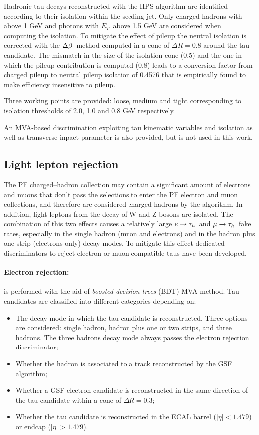 Hadronic tau decays reconstructed with the HPS algorithm are identified according to their isolation within the seeding jet. Only charged hadrons with \pT above 1 GeV and photons with $E_T$\ above 1.5 GeV are considered when computing the isolation. To mitigate the effect of pileup the neutral isolation is corrected with the $\Delta\beta$\ method computed in a cone of $\Delta R = 0.8$ around the tau candidate. The mismatch in the size of the isolation cone ($0.5$) and the one in which the pileup contribution is computed (0.8) leads to a conversion factor from charged pileup to neutral pileup isolation of 0.4576 that is empirically found to make efficiency insensitive to pileup.

Three working points are provided: loose, medium and tight corresponding to isolation thresholds of 2.0, 1.0 and 0.8 GeV respectively.

An MVA-based discrimination exploiting tau kinematic variables and isolation as well as transverse inpact parameter is also provided, but is not used in this work.

\subsection{Light lepton rejection}

The PF charged--hadron collection may contain a significant amount of electrons and muons that don't pass the selections to enter the PF electron and muon collections, and therefore are considered charged hadrons by the algorithm. In addition, light leptons from the decay of W and Z bosons are isolated. The combination of this two effects causes a relatively large $e\rightarrow\tau_h$\ and $\mu\rightarrow\tau_h$\ fake rates, especially in the single hadron (muon and electrons) and in the hadron plus one strip (electrons only) decay modes. To mitigate this effect dedicated discriminators to reject electron or muon compatible taus have been developed.

\paragraph{Electron rejection:} is performed with the aid of \emph{boosted decision trees} (BDT) MVA method. Tau candidates are classified into different categories depending on:

\begin{itemize}
\item The decay mode in which the tau candidate is reconstructed. Three options are considered: single hadron, hadron plus one or two strips, and three hadrons. The three hadrons decay mode always passes the electron rejection discriminator;
\item Whether the hadron is associated to a track reconstructed by the GSF algorithm;
\item Whether a GSF electron candidate is reconstructed in the same direction of the tau candidate within a cone of $\Delta R = 0.3$;
\item Whether the tau candidate is reconstructed in the ECAL barrel ($|\eta| < 1.479$) or endcap ($|\eta| > 1.479$).
\end{itemize}

